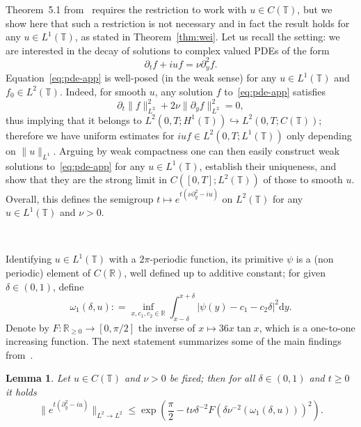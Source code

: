 \documentclass[11pt,oneside,reqno]{amsart}
\newcommand{\mathd}{\mathrm{d}}
\newtheorem{lemma}[theorem]{Lemma}
\numberwithin{equation}{section}
\begin{document}
Theorem~5.1 from~{\cite{wei}} requires the restriction to work with $u \in C
(\mathbb{T})$, but we show here that such a restriction is not necessary and
in fact the result holds for any $u \in L^1 (\mathbb{T})$, as stated in
Theorem~\ref{thm:wei}. Let us recall the setting: we are interested in the
decay of solutions to complex valued PDEs of the form
\begin{equation}
  \partial_t f + i u f = \nu \partial_y^2 f. \label{eq:pde-app}
\end{equation}
Equation~\ref{eq:pde-app} is well-posed (in the weak sense) for any $u \in L^1
(\mathbb{T})$ and $f_0 \in L^2 (\mathbb{T})$. Indeed, for smooth $u$, any
solution $f$ to~\eqref{eq:pde-app} satisfies
\[ \partial_t \| f \|_{L^2}^2 + 2 \nu \| \partial_y f \|_{L^2}^2 = 0, \]
thus implying that it belongs to $L^2 (0, T ; H^1 (\mathbb{T}))
\hookrightarrow L^2 (0, T ; C (\mathbb{T}))$; therefore we have uniform
estimates for $iu f \in L^2 (0, T ; L^1 (\mathbb{T}))$ only depending on $\| u
\|_{L^1}$. Arguing by weak compactness one can then easily construct weak
solutions to~\eqref{eq:pde-app} for any $u \in L^1 (\mathbb{T})$, establish
their uniqueness, and show that they are the strong limit in $C ([0, T] ; L^2
(\mathbb{T}))$ of those to smooth $u$. Overall, this defines the semigroup $t
\mapsto e^{t (\nu \partial_y^2 - i u)}$ on $L^2 (\mathbb{T})$ for any $u \in
L^1 (\mathbb{T})$ and $\nu > 0$.

\

Identifying $u \in L^1 (\mathbb{T})$ with a $2 \pi$-periodic function, its
primitive $\psi$ is a (non periodic) element of $C (\mathbb{R})$, well defined
up to additive constant; for given $\delta \in (0, 1)$, define
\[ \omega_1 (\delta, u) : = \inf_{x, c_1, c_2 \in \mathbb{R}} \int_{x -
   \delta}^{x + \delta} | \psi (y) - c_1 - c_2 \delta |^2 \mathd y. \]
Denote by $F : \mathbb{R}_{\geqslant 0} \rightarrow [0, \pi / 2]$ the inverse
of $x \mapsto 36 x \tan x$, which is a one-to-one increasing function. The
next statement summarizes some of the main findings from~{\cite{wei}}.

\begin{lemma}
  \label{lem:wei-summary}Let $u \in C (\mathbb{T})$ and $\nu > 0$ be fixed;
  then for all $\delta \in (0, 1)$ and $t \geqslant 0$ it holds
  \begin{equation}
    \| e^{t (\partial_y^2 - i u)} \|_{L^2 \rightarrow L^2} \leqslant \exp
    \left( \frac{\pi}{2} - t \nu \delta^{- 2} F (\delta \nu^{- 2} (\omega_1
    (\delta, u)))^2 \right) . \label{eq:wei-summary-app}
  \end{equation}
\end{lemma}
\end{document}

